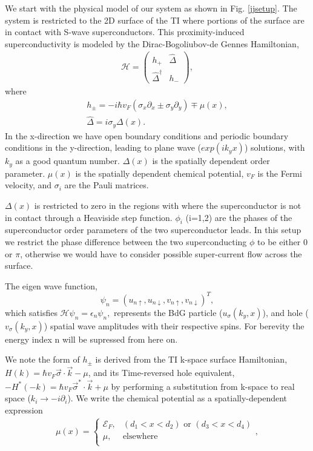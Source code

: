 \documentclass[11pt,revtex,aps]{report}
\begin{document}
We start with the physical model of our system as shown in Fig. \ref{jjsetup}. The system is restricted to the 2D surface of the TI where portions of the surface are in contact with S-wave superconductors.  This proximity-induced superconductivity is modeled by the Dirac-Bogoliubov-de Gennes Hamiltonian,
\begin{eqnarray}
&\mathcal{H}=\left(
\begin{array}{cc}
h_{+}  &  \hat{\Delta} \\
\hat{\Delta}^\dagger  &   h_{-}
\end{array}\label{fkmodel}
\right),&
\end{eqnarray}
where
\begin{eqnarray}
&h_{\pm}= -i\hbar  v_F (\sigma_x\partial_x \pm \sigma_y \partial_y) \mp \mu(x),&\\
&\hat{\Delta}= i\sigma_y  \Delta(x).&
\end{eqnarray}
 In the x-direction we have open boundary conditions and periodic boundary conditions in the y-direction, leading to plane wave ($exp({i k_y x})$) solutions, with $k_y$ as a good quantum number. $\Delta(x)$ is the spatially dependent order parameter.  $\mu(x)$ is the spatially dependent chemical potential, $v_F$ is the Fermi velocity, and $\sigma_i$ are the Pauli matrices. 

$\Delta(x)$ is restricted to zero in the regions with where the superconductor is not in contact through a Heaviside step function. $\phi_i$ (i=1,2) are the phases of the superconductor order parameters of the two superconductor leads. In this setup we restrict the phase difference between the two superconducting  $\phi$ to be either 0 or $\pi$, otherwise we would have to consider possible super-current flow across the surface.

The eigen wave function,
\begin{equation}
\psi_n=\left ( { u} _{n\uparrow},  { u}_{n\downarrow},  { v}_{n\uparrow}, { v}_{n\downarrow} \right )^T,
\end{equation} 
which satisfies $ \mathcal{H}\psi_n=\epsilon_n \psi_n, $ represents the BdG particle ($u_\sigma (k_y, x)$), and hole ($v_\sigma (k_y, x)$) spatial wave amplitudes with their respective spins. For berevity the energy index n will be supressed from here on.

We note the form of $h_{\pm}$ is derived from the TI k-space surface Hamiltonian, $H(k)=\hbar v_F \vec{\sigma}\cdot\vec{k}-\mu$, and its Time-reversed hole equivalent, $-H^*(-k)=\hbar v_F\vec{\sigma}^{\ast}\cdot\vec{k}+\mu$ by performing a substitution from k-space to real space ($k_i\rightarrow -i \partial_i$). We write the chemical potential as a spatially-dependent expression 
\begin{eqnarray}
\mu(x)=\left\{
\begin{array}{cc}
\mathcal{E}_F,&(d_1<x<d_2) \text{ or } (d_3<x<d_4)\\
\mu,& \text{elsewhere}\\
\end{array} \right .,
\end{eqnarray}
\end{document}
